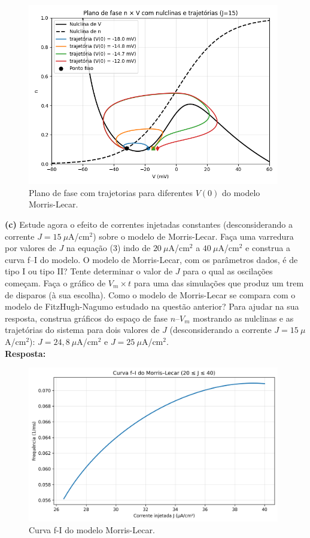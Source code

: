 \documentclass[english,11pt,a4paper]{article}
\begin{document}
	\begin{figure}[H]
		\centering
		\includegraphics[width=11cm]{../figures/ex_2b_3.png}
		\caption{Plano de fase com trajetorias para diferentes $V(0)$ do modelo Morris-Lecar.}
	\end{figure}
	
	\noindent\textbf{(c)} Estude agora o efeito de correntes injetadas constantes (desconsiderando a corrente $J = 15~\mu$A/cm$^2$) sobre o modelo de Morris-Lecar. Faça uma varredura por valores de $J$ na equação (3) indo de $20~\mu$A/cm$^2$ a $40~\mu$A/cm$^2$ e construa a curva f–I do modelo. O modelo de Morris-Lecar, com os parâmetros dados, é de tipo I ou tipo II? Tente determinar o valor de $J$ para o qual as oscilações começam. Faça o gráfico de $V_m \times t$ para uma das simulações que produz um trem de disparos (à sua escolha). Como o modelo de Morris-Lecar se compara com o modelo de FitzHugh-Nagumo estudado na questão anterior? Para ajudar na sua resposta, construa gráficos do espaço de fase $n$–$V_m$ mostrando as nulclinas e as trajetórias do sistema para dois valores de $J$ (desconsiderando a corrente $J = 15~\mu$A/cm$^2$): $J = 24{,}8~\mu$A/cm$^2$ e $J = 25~\mu$A/cm$^2$.\\
	
	\noindent\textbf{Resposta:}
	
	\begin{figure}[H]
		\centering
		\includegraphics[width=11cm]{../figures/ex_2c_fI.png}
		\caption{Curva f-I do modelo Morris-Lecar.}
	\end{figure}
	
\end{document}
